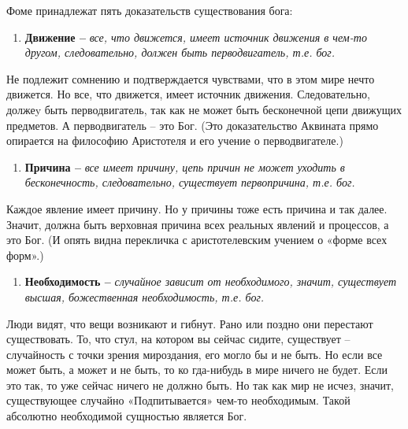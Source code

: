 \documentclass[a4paper, 14pt]{extreport}
\begin{document}
Фоме принадлежат пять доказательств существования бога:

\begin{enumerate}
\def\labelenumi{\arabic{enumi}.}
\item
  
  \textbf{Движение --}
  \emph{все, что движется, имеет источник движения в чем-то другом,
  следовательно, должен быть перводвигатель, т.е. бог.}
  
\end{enumerate}

Не подлежит сомнению и подтверждается чувствами, что в этом мире нечто
движется. Но все, что движется, имеет источник движения. Следовательно,
должеy быть перводвигатель, так как не может быть бесконечной цепи
движущих предметов. А перводвигатель -- это Бог. (Это доказательство
Аквината прямо опирается на философию Аристотеля и его учение о
перводвигателе.)

\begin{enumerate}
\def\labelenumi{\arabic{enumi}.}
\setcounter{enumi}{1}
\item
  
  \textbf{Причина --}
  \emph{все имеет причину, цепь причин не может уходить в бесконечность,
  следовательно, существует первопричина, т.е. бог.}
  
\end{enumerate}

Каждое явление имеет причину. Но у причины тоже есть причина и так
далее. Значит, должна быть верховная причина всех реальных явлений и
процессов, а это Бог. (И опять видна перекличка с аристотелевским
учением о «форме всех форм».)

\begin{enumerate}
\def\labelenumi{\arabic{enumi}.}
\setcounter{enumi}{2}
\item
  
  \textbf{Необходимость --}
  \emph{случайное зависит от необходимого, значит, существует высшая,
  божественная необходимость, т.е. бог.}
  
\end{enumerate}

Люди видят, что вещи возникают и гибнут. Рано или поздно они перестают
существовать. То, что стул, на котором вы сейчас сидите, существует --
случайность с точки зрения мироздания, его могло бы и не быть. Но если
все может быть, а может и не быть, то ко­ гда-нибудь в мире ничего не
будет. Если это так, то уже сейчас ничего не должно быть. Но так как мир
не исчез, значит, существующее случайно «Подпитывается» чем-то
необходимым. Такой абсолютно необходимой сущностью является Бог.
\end{document}
